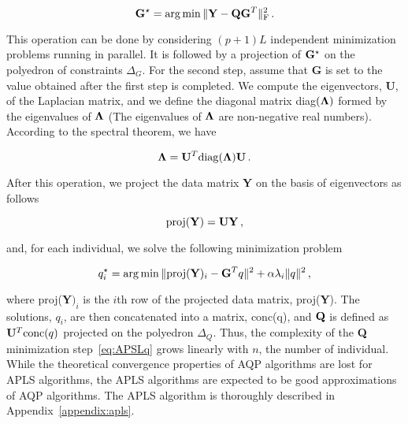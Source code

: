 \begin{equation}
{\bf G}^\star = \arg \min  \|  {\bf Y} - {\bf QG}^T \|^2_{\rm F} \, .
\end{equation}

This operation can be done by considering $(p+1)L$ independent minimization problems running in parallel. It is followed by a projection of ${\bf G}^\star$ on the polyedron of constraints $\Delta_G$. For the second step, assume that {\bf G} is set to the value obtained after the first step is completed. We compute the eigenvectors, {\bf U}, of the Laplacian matrix, and we define the diagonal matrix diag$({\bf \Lambda})$ formed by the eigenvalues of ${\bf \Lambda}$ (The eigenvalues of ${\bf \Lambda}$ are non-negative real numbers). According to the spectral theorem, we have

$$
{\bf \Lambda} = {\bf U}^T {\rm diag}({\bf \Lambda}) {\bf U} \, .
$$

\noindent  After this operation, we project the data matrix {\bf Y} on the basis of eigenvectors as follows

$$
{\rm proj} ({\bf Y}) = {\bf U}{\bf Y} \, , 
$$

\noindent and, for each individual, we solve the following minimization problem

\begin{equation}
q_i^\star = \arg \min  \|  {\rm proj} ({\bf Y})_i  - {\bf G}^Tq \|^2 + \alpha \lambda_i   \| q \|^2  \, ,
\label{eq:APSLq}
\end{equation}

\noindent where  proj({\bf Y}$)_i$ is the $i$th row of the projected data matrix, proj({\bf Y}). The solutions, $q_i$, are then concatenated into a matrix, {\rm conc}(q), and ${\bf Q}$ is defined as ${\bf U}^T {\rm conc}(q)$ projected on the polyedron $\Delta_Q$. Thus, the complexity of the {\bf Q} minimization step~\ref{eq:APSLq} grows linearly with $n$, the number of individual. While the theoretical convergence properties of AQP algorithms are lost for APLS algorithms, the APLS algorithms are expected to be good approximations of AQP algorithms. The APLS algorithm is thoroughly described in Appendix~\ref{appendix:apls}.


